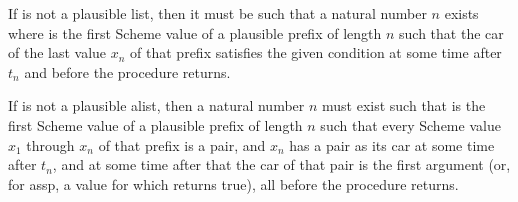 \begin{entry}{%
}


If  is not a plausible list, then it must be such that a
natural number $n$ exists where  is the first Scheme value of a
plausible prefix of length $n$ such that
the car of the last value $x_n$ of that
prefix satisfies the given condition at some time after $t_n$ and before
the procedure returns.
\end{entry}

\begin{entry}{%
}


If  is not a plausible alist, then a natural number $n$ must
exist such that  is the first Scheme value of a plausible
prefix of length $n$ such that every Scheme value $x_1$ through $x_n$
of that prefix is a pair, and $x_n$ has a pair as its car at some time
after $t_n$, and at some time after that the car of that pair is the
first argument (or, for {\cf assp}, a value for which 
returns true), all before the procedure returns.
\end{entry}

